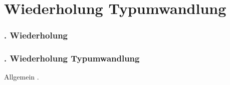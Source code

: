 \def\stitle{Wiederholung Typumwandlung}
\section{\stitle}\label{K:wdh}
\begin{frame}
  \frametitle{\kap. Wiederholung}%
\tableofcontents[current]
\end{frame}


\begin{frame}[fragile]%
  \frametitle{\kap. \stitle}%
\medskip

Allgemein .


\end{frame}
